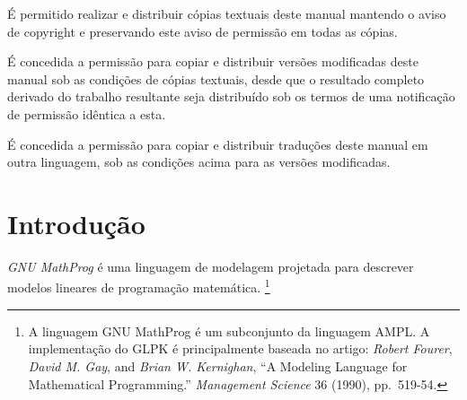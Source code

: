 \documentclass[11pt, brazil]{report}
\begin{document}
\noindent
É permitido realizar e distribuir cópias textuais deste manual
mantendo o aviso de copyright e preservando este aviso de permissão
em todas as cópias.

\noindent
É concedida a permissão para copiar e distribuir versões modificadas deste manual sob
as condições de cópias textuais, desde que o resultado completo derivado
do trabalho resultante seja distribuído sob os termos de uma notificação
de permissão idêntica a esta.


\noindent
É concedida a permissão para copiar e distribuir traduções deste manual
em outra linguagem, sob as condições acima para as versões modificadas.



\newpage

{\setlength{\parskip}{0pt}
\tableofcontents
}


\chapter{Introdução}

{\it GNU MathProg} é uma linguagem de modelagem projetada para descrever
modelos lineares de programação matemática.
\footnote{A linguagem GNU MathProg é um subconjunto da linguagem AMPL.
A implementação do GLPK é \linebreak principalmente baseada no artigo:
{\it Robert Fourer}, {\it David M. Gay}, and
{\it Brian W. Kernighan}, ``A Modeling Language for Mathematical
Programming.'' {\it Management Science} 36 (1990), pp.~519-54.}

\end{document}
